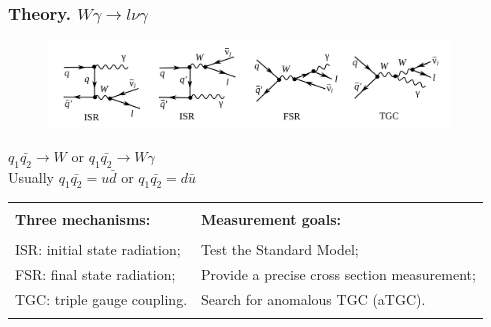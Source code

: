 \begin{frame}\frametitle{Theory. $W\gamma\rightarrow l\nu\gamma$}
   \begin{figure}[htb]
      \begin{center}
        \scriptsize
          \includegraphics[width=0.95\textwidth]{../figs/ForPresentation/feynmWg_LO_01.png}
       \end{center}
    \end{figure}
\scriptsize
$q_1\bar{q_2}\rightarrow W$ or $q_1\bar{q_2}\rightarrow W\gamma$\\
Usually $q_1\bar{q_2}=u\bar{d}$ or  $q_1\bar{q_2}=d\bar{u}$\\

\begin{table}[h]
  \scriptsize
  \begin{center}
   \begin{tabular}{|l|l|}
    \hline
         &  \\ 
     {\bfseries{Three mechanisms:}}  & {\bfseries{Measurement goals:}}  \\
         &  \\ 
     ISR: initial state radiation;   & Test the Standard Model;  \\ 
     FSR: final state radiation;    &  Provide a precise cross section measurement; \\ 
     TGC: triple gauge coupling.    &  Search for anomalous TGC (aTGC).\\ 
    &  \\  \hline
  \end{tabular}
  \end{center}
\end{table}

\end{frame}%

